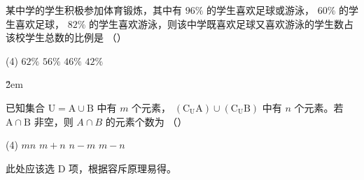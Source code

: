 \begin{example}
    某中学的学生积极参加体育锻炼，其中有 $96 \%$ 的学生喜欢足球或游泳， $60 \%$ 的学生喜欢足球， $82 \%$ 的学生喜欢游泳，则该中学既喜欢足球又喜欢游泳的学生数占该校学生总数的比例是 （\qquad）
    \begin{tasks}(4)
        \task $62 \%$
        \task $56 \%$
        \task $46 \%$
        \task $42 \%$
    \end{tasks}
\end{example}

\v{2em}

\begin{example}
    已知集合 $\mathrm{U}=\mathrm{A} \cup \mathrm{B}$ 中有 $m$ 个元素， $\left(\mathrm{C}_{\mathrm{U}} \mathrm{A}\right) \cup\left(\mathrm{C}_{\mathrm{U}} \mathrm{B}\right)$ 中有 $n$ 个元素。若 $\mathrm{A} \cap \mathrm{B}$ 非空，则 $A \cap B$ 的元素个数为 （\qquad）
    \begin{tasks}(4)
        \task $m n$
        \task $m+n$
        \task $n-m$
        \task $m-n$
    \end{tasks}
\end{example}

\begin{solution}
    此处应该选 D 项，根据容斥原理易得。
\end{solution}